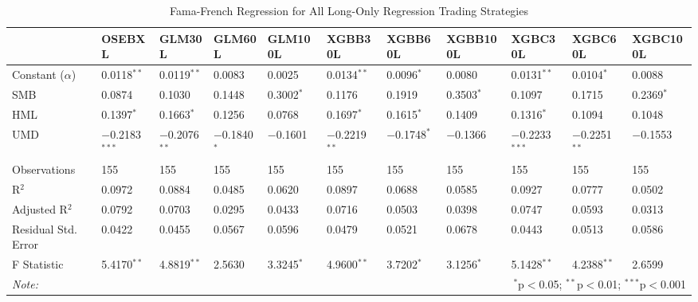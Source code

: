 \begin{table}
\centering 
  \caption{Fama-French Regression for All Long-Only Regression Trading Strategies} 
  \vspace{1em}
  \label{table:models_with_L-all} 
\begin{tabularx}{\textwidth}{lXXXXXXXXXX} 
\toprule
 & OSEBXL & GLM30L & GLM60L & GLM100L & XGBB30L & XGBB60L & XGBB100L & XGBC30L & XGBC60L & XGBC100L \\ 
\midrule
 Constant ($\alpha$) & 0.0118$^{**}$ & 0.0119$^{**}$ & 0.0083 & 0.0025 & 0.0134$^{**}$ & 0.0096$^{*}$ & 0.0080 & 0.0131$^{**}$ & 0.0104$^{*}$ & 0.0088 \\ 
 SMB & 0.0874 & 0.1030 & 0.1448 & 0.3002$^{*}$ & 0.1176 & 0.1919 & 0.3503$^{*}$ & 0.1097 & 0.1715 & 0.2369$^{*}$ \\ 
 HML & 0.1397$^{*}$ & 0.1663$^{*}$ & 0.1256 & 0.0768 & 0.1697$^{*}$ & 0.1615$^{*}$ & 0.1409 & 0.1316$^{*}$ & 0.1094 & 0.1048 \\ 
 UMD & $-$0.2183$^{***}$ & $-$0.2076$^{**}$ & $-$0.1840$^{*}$ & $-$0.1601 & $-$0.2219$^{**}$ & $-$0.1748$^{*}$ & $-$0.1366 & $-$0.2233$^{***}$ & $-$0.2251$^{**}$ & $-$0.1553 \\ 
\midrule
 Observations & 155 & 155 & 155 & 155 & 155 & 155 & 155 & 155 & 155 & 155 \\ 
 R$^{2}$ & 0.0972 & 0.0884 & 0.0485 & 0.0620 & 0.0897 & 0.0688 & 0.0585 & 0.0927 & 0.0777 & 0.0502 \\ 
 Adjusted R$^{2}$ & 0.0792 & 0.0703 & 0.0295 & 0.0433 & 0.0716 & 0.0503 & 0.0398 & 0.0747 & 0.0593 & 0.0313 \\ 
 Residual Std. Error & 0.0422 & 0.0455 & 0.0567 & 0.0596 & 0.0479 & 0.0521 & 0.0678 & 0.0443 & 0.0513 & 0.0586 \\ 
 F Statistic & 5.4170$^{**}$ & 4.8819$^{**}$ & 2.5630 & 3.3245$^{*}$ & 4.9600$^{**}$ & 3.7202$^{*}$ & 3.1256$^{*}$ & 5.1428$^{**}$ & 4.2388$^{**}$ & 2.6599 \\ 
\bottomrule 
\textit{Note:} & \multicolumn{10}{r}{$^{*}$p$<$0.05; $^{**}$p$<$0.01; $^{***}$p$<$0.001} \\ 
\end{tabularx} 
\end{table} 

